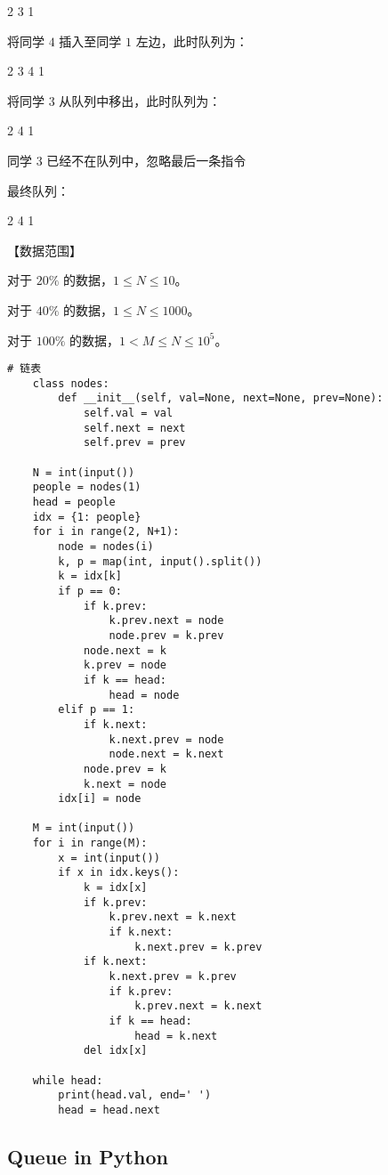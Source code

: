 \documentclass[../main]{subfiles}
\begin{document}
2 3 1  

将同学 $4$ 插入至同学 $1$ 左边，此时队列为：

2 3 4 1  

将同学 $3$ 从队列中移出，此时队列为：

2 4 1

同学 $3$ 已经不在队列中，忽略最后一条指令

最终队列：

2 4 1  

【数据范围】

对于 $20\%$ 的数据，$1\leq N\leq 10$。

对于 $40\%$ 的数据，$1\leq N\leq 1000$。

对于 $100\%$ 的数据，$1<M\leq N\leq 10^5$。


\begin{lstlisting}[style = Python]
    # 链表
    class nodes:
        def __init__(self, val=None, next=None, prev=None):
            self.val = val
            self.next = next
            self.prev = prev
    
    N = int(input())
    people = nodes(1)
    head = people
    idx = {1: people}
    for i in range(2, N+1):
        node = nodes(i)
        k, p = map(int, input().split())
        k = idx[k]
        if p == 0:
            if k.prev:
                k.prev.next = node
                node.prev = k.prev
            node.next = k
            k.prev = node
            if k == head:
                head = node
        elif p == 1:
            if k.next:
                k.next.prev = node
                node.next = k.next
            node.prev = k
            k.next = node
        idx[i] = node
        
    M = int(input())
    for i in range(M):
        x = int(input())
        if x in idx.keys():
            k = idx[x]
            if k.prev:
                k.prev.next = k.next
                if k.next:
                    k.next.prev = k.prev
            if k.next:
                k.next.prev = k.prev
                if k.prev:
                    k.prev.next = k.next
                if k == head:
                    head = k.next
            del idx[x]
    
    while head:
        print(head.val, end=' ')
        head = head.next
\end{lstlisting}

\newpage
\subsection{Queue in Python}
\end{document}
